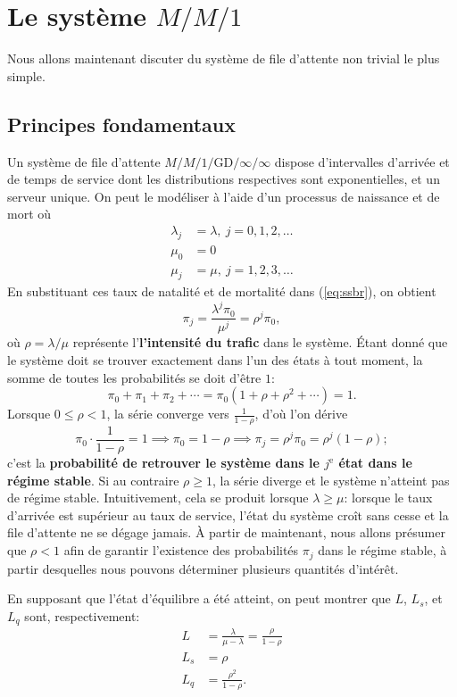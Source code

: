 \section{Le syst\`eme $M/M/1$}
Nous allons maintenant discuter du système de file d'attente non trivial le plus simple.  
\subsection{Principes fondamentaux} Un syst\`eme de file d'attente $M/M/1/\textrm{GD}/\infty/\infty$  dispose d'intervalles d'arrivée et de temps de service dont les distributions respectives sont exponentielles, et un serveur unique. On peut le modéliser \`a l'aide d'un processus de naissance et de mort o\`u
\begin{align*}
\lambda_{j} &= \lambda, \ j=0,1,2,\ldots \\ 
\mu_{0} &= 0 \\
\mu_{j} &= \mu,\  j=1,2,3,\ldots 
\end{align*}
En substituant ces taux de natalit\'e et de mortalit\'e dans (\ref{eq:ssbr}), on obtient  
$$\pi_{j} = \frac{\lambda^{j} \pi_{0}}{\mu^{j}}=\rho^j \pi_0,$$ o\`u $\rho = \lambda/\mu$ repr\'esente l'\textbf{l'intensité du trafic} dans le syst\`eme. \newpage\noindent 
Étant donné que le système doit se trouver exactement dans l'un des \'etats à tout moment, la somme de toutes les probabilités se doit d'\^etre $1$: $$\pi_{0}+\pi_1 + \pi_2+\cdots = \pi_0(1+\rho+\rho^{2}+\cdots ) = 1.$$
Lorsque $0 \leq \rho < 1$, la s\'erie converge vers $\frac{1}{1-\rho}$, d'o\`u l'on d\'erive $$\pi_{0}\cdot \frac{1}{1-\rho} = 1 \implies \pi_0 = 1-\rho \implies \pi_{j} = \rho^{j} \pi_0 = \rho^j (1-\rho);$$
c'est la \textbf{probabilit\'e de retrouver le syst\`eme  dans le  $j^{\text{e}}$ \'etat dans le r\'egime stable}. Si au contraire $\rho \geq 1$, la s\'erie diverge et le syst\`eme n'atteint pas de r\'egime stable. Intuitivement, cela se produit lorsque $\lambda \geq \mu$: lorsque le taux d'arrivée est supérieur au taux de service, l'état du système croît sans cesse et la file d'attente ne se d\'egage jamais.
\newl À partir de maintenant, nous allons présumer que $\rho < 1$ afin de garantir l'existence des probabilités  $\pi_{j}$ dans le r\'egime stable, à partir desquelles nous pouvons déterminer plusieurs quantités d'intérêt. \par En supposant que l'état d'équilibre a été atteint, on peut montrer que $L$, $L_{s}$, et $L_{q}$ sont, respectivement:
\begin{align*}
L &= \frac{\lambda}{\mu - \lambda}=\frac{\rho}{1-\rho}\\
L_{s} &= \rho\\
 L_{q} &= \frac{\rho^{2}}{1-\rho}.
 \end{align*}
